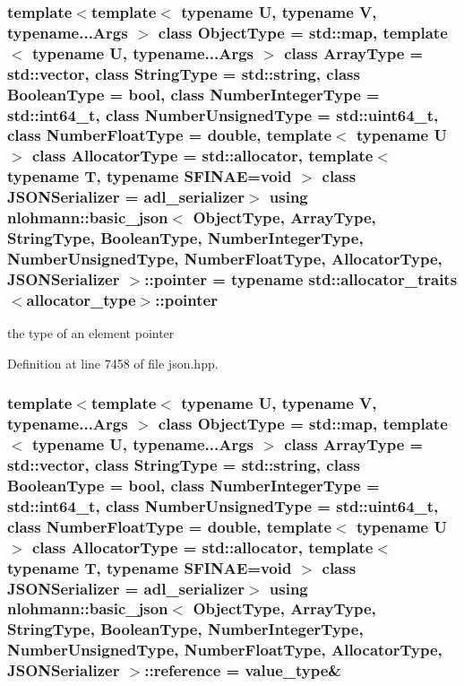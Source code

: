\subsubsection[{\texorpdfstring{pointer}{pointer}}]{\setlength{\rightskip}{0pt plus 5cm}template$<$template$<$ typename U, typename V, typename...\+Args $>$ class Object\+Type = std\+::map, template$<$ typename U, typename...\+Args $>$ class Array\+Type = std\+::vector, class String\+Type  = std\+::string, class Boolean\+Type  = bool, class Number\+Integer\+Type  = std\+::int64\+\_\+t, class Number\+Unsigned\+Type  = std\+::uint64\+\_\+t, class Number\+Float\+Type  = double, template$<$ typename U $>$ class Allocator\+Type = std\+::allocator, template$<$ typename T, typename S\+F\+I\+N\+A\+E=void $>$ class J\+S\+O\+N\+Serializer = adl\+\_\+serializer$>$ using {\bf nlohmann\+::basic\+\_\+json}$<$ Object\+Type, Array\+Type, String\+Type, Boolean\+Type, Number\+Integer\+Type, Number\+Unsigned\+Type, Number\+Float\+Type, Allocator\+Type, J\+S\+O\+N\+Serializer $>$\+::{\bf pointer} =  typename std\+::allocator\+\_\+traits$<${\bf allocator\+\_\+type}$>$\+::{\bf pointer}}\hypertarget{classnlohmann_1_1basic__json_aefee1f777198c68724bd127e0c8abbe4}{}\label{classnlohmann_1_1basic__json_aefee1f777198c68724bd127e0c8abbe4}


the type of an element pointer 



Definition at line 7458 of file json.\+hpp.

\subsubsection[{\texorpdfstring{reference}{reference}}]{\setlength{\rightskip}{0pt plus 5cm}template$<$template$<$ typename U, typename V, typename...\+Args $>$ class Object\+Type = std\+::map, template$<$ typename U, typename...\+Args $>$ class Array\+Type = std\+::vector, class String\+Type  = std\+::string, class Boolean\+Type  = bool, class Number\+Integer\+Type  = std\+::int64\+\_\+t, class Number\+Unsigned\+Type  = std\+::uint64\+\_\+t, class Number\+Float\+Type  = double, template$<$ typename U $>$ class Allocator\+Type = std\+::allocator, template$<$ typename T, typename S\+F\+I\+N\+A\+E=void $>$ class J\+S\+O\+N\+Serializer = adl\+\_\+serializer$>$ using {\bf nlohmann\+::basic\+\_\+json}$<$ Object\+Type, Array\+Type, String\+Type, Boolean\+Type, Number\+Integer\+Type, Number\+Unsigned\+Type, Number\+Float\+Type, Allocator\+Type, J\+S\+O\+N\+Serializer $>$\+::{\bf reference} =  {\bf value\+\_\+type}\&}\hypertarget{classnlohmann_1_1basic__json_ac6a5eddd156c776ac75ff54cfe54a5bc}{}\label{classnlohmann_1_1basic__json_ac6a5eddd156c776ac75ff54cfe54a5bc}


